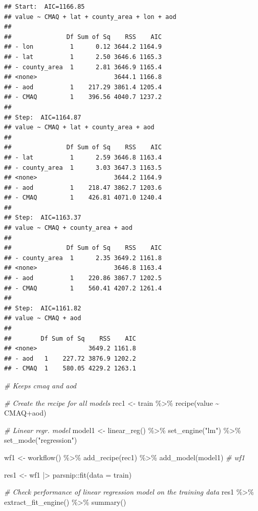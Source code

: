 \documentclass[
]{article}
\newenvironment{Shaded}{\begin{snugshade}}{\end{snugshade}}
\newcommand{\AttributeTok}[1]{\textcolor[rgb]{0.77,0.63,0.00}{#1}}
\newcommand{\CommentTok}[1]{\textcolor[rgb]{0.56,0.35,0.01}{\textit{#1}}}
\newcommand{\FunctionTok}[1]{\textcolor[rgb]{0.00,0.00,0.00}{#1}}
\newcommand{\NormalTok}[1]{#1}
\newcommand{\OtherTok}[1]{\textcolor[rgb]{0.56,0.35,0.01}{#1}}
\newcommand{\SpecialCharTok}[1]{\textcolor[rgb]{0.00,0.00,0.00}{#1}}
\newcommand{\StringTok}[1]{\textcolor[rgb]{0.31,0.60,0.02}{#1}}
\begin{document}
\begin{verbatim}
## Start:  AIC=1166.85
## value ~ CMAQ + lat + county_area + lon + aod
## 
##               Df Sum of Sq    RSS    AIC
## - lon          1      0.12 3644.2 1164.9
## - lat          1      2.50 3646.6 1165.3
## - county_area  1      2.81 3646.9 1165.4
## <none>                     3644.1 1166.8
## - aod          1    217.29 3861.4 1205.4
## - CMAQ         1    396.56 4040.7 1237.2
## 
## Step:  AIC=1164.87
## value ~ CMAQ + lat + county_area + aod
## 
##               Df Sum of Sq    RSS    AIC
## - lat          1      2.59 3646.8 1163.4
## - county_area  1      3.03 3647.3 1163.5
## <none>                     3644.2 1164.9
## - aod          1    218.47 3862.7 1203.6
## - CMAQ         1    426.81 4071.0 1240.4
## 
## Step:  AIC=1163.37
## value ~ CMAQ + county_area + aod
## 
##               Df Sum of Sq    RSS    AIC
## - county_area  1      2.35 3649.2 1161.8
## <none>                     3646.8 1163.4
## - aod          1    220.86 3867.7 1202.5
## - CMAQ         1    560.41 4207.2 1261.4
## 
## Step:  AIC=1161.82
## value ~ CMAQ + aod
## 
##        Df Sum of Sq    RSS    AIC
## <none>              3649.2 1161.8
## - aod   1    227.72 3876.9 1202.2
## - CMAQ  1    580.05 4229.2 1263.1
\end{verbatim}

\begin{Shaded}
\begin{Highlighting}[]
\CommentTok{\# Keeps cmaq and aod}

\CommentTok{\# Create the recipe for all models}
\NormalTok{rec1 }\OtherTok{\textless{}{-}}\NormalTok{ train }\SpecialCharTok{\%\textgreater{}\%} 
    \FunctionTok{recipe}\NormalTok{(value }\SpecialCharTok{\textasciitilde{}}\NormalTok{ CMAQ}\SpecialCharTok{+}\NormalTok{aod) }

\CommentTok{\# Linear regr. model}
\NormalTok{model1 }\OtherTok{\textless{}{-}} \FunctionTok{linear\_reg}\NormalTok{() }\SpecialCharTok{\%\textgreater{}\%} 
    \FunctionTok{set\_engine}\NormalTok{(}\StringTok{"lm"}\NormalTok{) }\SpecialCharTok{\%\textgreater{}\%} 
    \FunctionTok{set\_mode}\NormalTok{(}\StringTok{"regression"}\NormalTok{)}

\NormalTok{wf1 }\OtherTok{\textless{}{-}} \FunctionTok{workflow}\NormalTok{() }\SpecialCharTok{\%\textgreater{}\%} 
    \FunctionTok{add\_recipe}\NormalTok{(rec1) }\SpecialCharTok{\%\textgreater{}\%} 
    \FunctionTok{add\_model}\NormalTok{(model1)}
\CommentTok{\# wf1}

\NormalTok{res1 }\OtherTok{\textless{}{-}}\NormalTok{ wf1 }\SpecialCharTok{|\textgreater{}}\NormalTok{ parsnip}\SpecialCharTok{::}\FunctionTok{fit}\NormalTok{(}\AttributeTok{data =}\NormalTok{ train)}

\CommentTok{\# Check performance of linear regression model on the training data}
\NormalTok{res1 }\SpecialCharTok{\%\textgreater{}\%} 
    \FunctionTok{extract\_fit\_engine}\NormalTok{() }\SpecialCharTok{\%\textgreater{}\%} 
    \FunctionTok{summary}\NormalTok{()}
\end{Highlighting}
\end{Shaded}
\end{document}
